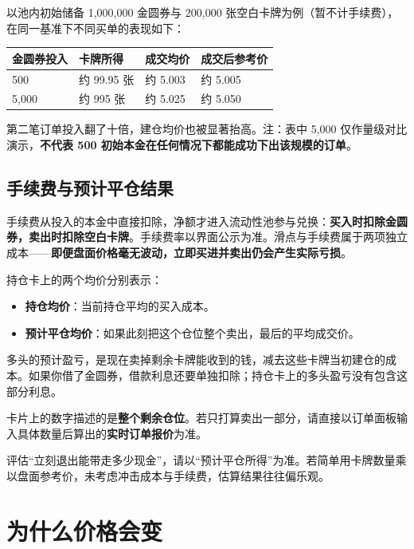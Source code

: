 \documentclass[11pt,a4paper,twoside]{article}
\newcommand{\gold}{金圆券}
\newcommand{\cards}{空白卡牌}
\begin{document}
以池内初始储备 1,000,000 \gold{}与 200,000 张\cards{}为例（暂不计手续费），在同一基准下不同买单的表现如下：
\begin{center}
\begin{tabularx}{\linewidth}{@{}l XXX@{}}
\toprule
\rowcolor{lightGray}
\gold{}投入 & 卡牌所得 & 成交均价 & 成交后参考价 \\
\midrule
500 & 约 99.95 张 & 约 5.003 & 约 5.005 \\
5,000 & 约 995 张 & 约 5.025 & 约 5.050 \\
\bottomrule
\end{tabularx}
\end{center}
第二笔订单投入翻了十倍，建仓均价也被显著抬高。注：表中 5,000 仅作量级对比演示，\textbf{不代表 500 初始本金在任何情况下都能成功下出该规模的订单}。

\subsection{手续费与预计平仓结果}

手续费从投入的本金中直接扣除，净额才进入流动性池参与兑换：\textbf{买入时扣除\gold{}，卖出时扣除\cards{}}。手续费率以界面公示为准。滑点与手续费属于两项独立成本——\textbf{即便盘面价格毫无波动，立即买进并卖出仍会产生实际亏损}。

持仓卡上的两个均价分别表示：

\begin{itemize}
  \item \textbf{持仓均价}：当前持仓平均的买入成本。
  \item \textbf{预计平仓均价}：如果此刻把这个仓位整个卖出，最后的平均成交价。
\end{itemize}

多头的预计盈亏，是现在卖掉剩余卡牌能收到的钱，减去这些卡牌当初建仓的成本。如果你借了\gold{}，借款利息还要单独扣除；持仓卡上的多头盈亏没有包含这部分利息。

卡片上的数字描述的是\textbf{整个剩余仓位}。若只打算卖出一部分，请直接以订单面板输入具体数量后算出的\textbf{实时订单报价}为准。

\begin{notebox}
评估“立刻退出能带走多少现金”，请以“预计平仓所得”为准。若简单用卡牌数量乘以盘面参考价，未考虑冲击成本与手续费，估算结果往往偏乐观。
\end{notebox}

\section{为什么价格会变}
\end{document}
